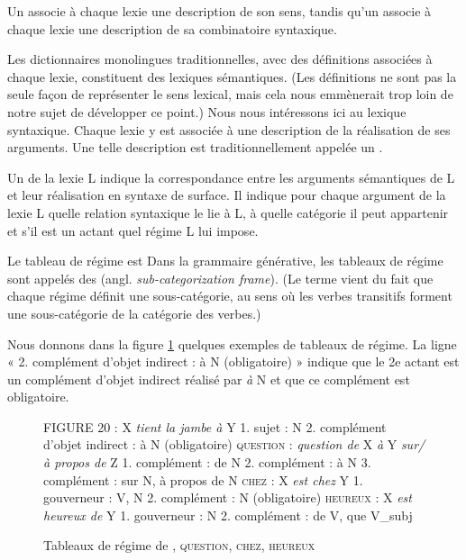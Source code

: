 {Un  associe à chaque lexie une description de son sens, tandis qu’un  associe à chaque lexie une description de sa combinatoire syntaxique.}

Les dictionnaires monolingues traditionnelles, avec des définitions associées à chaque lexie, constituent des lexiques sémantiques. (Les définitions ne sont pas la seule façon de représenter le sens lexical, mais cela nous emmènerait trop loin de notre sujet de développer ce point.) Nous nous intéressons ici au lexique syntaxique. Chaque lexie y est associée à une description de la réalisation de ses arguments. Une telle description est traditionnellement appelée un . 

{Un  de la lexie L indique la correspondance entre les arguments sémantiques de L et leur réalisation en syntaxe de surface. Il indique pour chaque argument de la lexie L quelle relation syntaxique le lie à L, à quelle catégorie il peut appartenir et s’il est un actant quel régime L lui impose.}

Le tableau de régime est Dans la grammaire générative, les tableaux de régime sont appelés des  (angl. \textit{sub-categorization frame}). (Le terme vient du fait que chaque régime définit une sous-catégorie, au sens où les verbes transitifs forment une sous-catégorie de la catégorie des verbes.)

Nous donnons dans la figure \ref{fig:13-regime} quelques exemples de tableaux de régime. La ligne « 2. complément d’objet indirect : à N (obligatoire) » indique que le 2e actant est un complément d’objet indirect réalisé par \textit{à} N et que ce complément est obligatoire.

\begin{figure}
FIGURE 20\label{fig:13-regime}
 : X \textit{tient la jambe à} Y
1. sujet : N
2. complément d’objet indirect : à N (obligatoire)
\textsc{question} : \textit{question de} X \textit{à }Y \textit{sur/à propos de} Z
1. complément : de N
2. complément : à N
3. complément : sur N, à propos de N
\textsc{chez} : X \textit{est chez} Y
1. gouverneur : V, N
2. complément : N (obligatoire)
\textsc{heureux} : X \textit{est heureux de} Y
1. gouverneur : N
2. complément : de V, que V\_subj
\caption{Tableaux de régime de , \textsc{question}, \textsc{chez}, \textsc{heureux}}
\end{figure}

